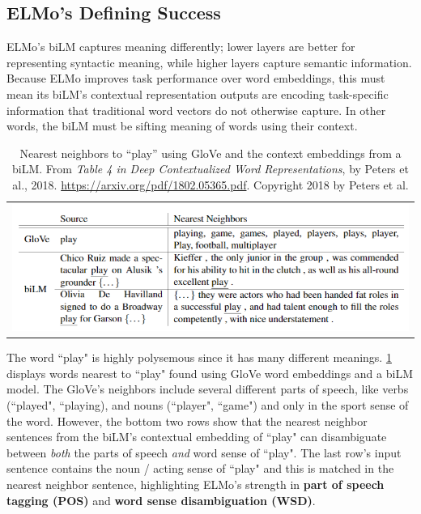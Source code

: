 \subsection{ELMo's Defining Success} \label{sec:ELMoSuccessFeature}

ELMo's biLM captures meaning differently; lower layers are better for representing syntactic meaning, while higher layers capture semantic information. Because ELMo improves task performance over word embeddings, this must mean its biLM's contextual representation outputs are encoding task-specific information that traditional word vectors do not otherwise capture. In other words, the biLM must be sifting meaning of words using their context. 


\begin{table}[ht!]
  \centering
  \begin{tabular}{ c }
    
    \begin{minipage}{.8\textwidth}
      \includegraphics[width=\linewidth]{imgs/table_elmoPlay.png}
    \end{minipage}
    
  \end{tabular}
  \caption{\footnotesize Nearest neighbors to ``play” using GloVe and the context embeddings from a biLM. From \emph{Table 4 in Deep Contextualized Word Representations}, by Peters et al., 2018. \url{https://arxiv.org/pdf/1802.05365.pdf}. Copyright 2018 by Peters et al.}
  \label{tbl:elmoPlayExample}
\end{table}


The word ``play" is highly polysemous since it has many different meanings.  \cref{tbl:elmoPlayExample} displays words nearest to ``play" found using GloVe word embeddings and a biLM model. The GloVe's neighbors include several different parts of speech, like verbs (``played", ``playing), and nouns (``player", ``game") and only in the sport sense of the word. However, the bottom two rows show that the nearest neighbor sentences from the biLM's contextual embedding of ``play" can disambiguate between \emph{both} the parts of speech \emph{and} word sense of ``play". The last row's input sentence contains the noun / acting sense of ``play" and this is matched in the nearest neighbor sentence, highlighting ELMo's strength in \textbf{part of speech tagging (POS)} and \textbf{word sense disambiguation (WSD)}. 